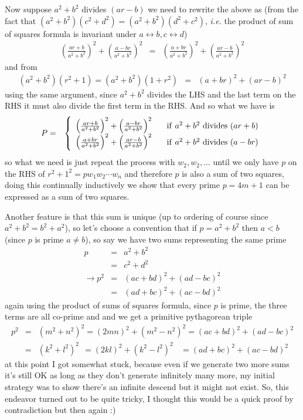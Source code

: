 \documentclass[aps,preprint,preprintnumbers,nofootinbib,showpacs,prd]{revtex4-1}
\newcommand{\ie}{{\it i.e.} }
\newcommand{\nbea}{\begin{eqnarray*}}
\newcommand{\neea}{\end{eqnarray*}}
\begin{document}
Now suppose $a^2 + b^2$ divides $(ar-b)$ we need to rewrite the above as (from the fact that $(a^2 + b^2)(c^2 + d^2) = (a^2 + b^2)(d^2 + c^2)$, \ie the product of sum of squares formula is invariant under $a\leftrightarrow b, c\leftrightarrow d$)
%
\nbea
\left(\frac{ar + b}{a^2 + b^2}\right)^2 + \left(\frac{a - br}{a^2 + b^2}\right)^2 & = & \left(\frac{a + br}{a^2 + b^2}\right)^2 + \left(\frac{ar - b}{a^2 + b^2}\right)^2
\neea
%
and from
%
\nbea
(a^2 + b^2)(r^2 + 1)  = (a^2 + b^2)(1 + r^2) & = & (a+br)^2 + (ar-b)^2
\neea
%
using the same argument, since $a^2 + b^2$ divides the LHS and the last term on the RHS it must also divide the first term in the RHS. And so what we have is
%
\nbea
P & = & \left \{
\begin{array}{l }
\left(\frac{ar + b}{a^2 + b^2}\right)^2 + \left(\frac{a - br}{a^2 + b^2}\right)^2 ~~~~~{\rm if~} a^2 + b^2 ~{\rm divides~} (ar+b) \\ 
\left(\frac{a + br}{a^2 + b^2}\right)^2 + \left(\frac{ar - b}{a^2 + b^2}\right)^2 ~~~~~{\rm if~} a^2 + b^2 ~{\rm divides~} (a-br)
\end{array} \right.
\neea
%
so what we need is just repeat the process with $w_2, w_2, \dots$ until we only have $p$ on the RHS of $r^2 + 1^2 = pw_1w_2\cdots w_n$ and therefore $p$ is also a sum of two squares, doing this continually inductively we show that every prime $p = 4m+1$ can be expressed as a sum of two squares.

Another feature is that this sum is unique (up to ordering of course since $a^2 + b^2 = b^2 + a^2$), so let's choose a convention that if $p = a^2 + b^2$ then $a<b$ (since $p$ is prime $a \neq b$), so say we have two sums representing the same prime
%
\nbea
p & = & a^2 + b^2 \\
& = & c^2 + d^2 \\
\to p^2 & = & (ac + bd)^2 + (ad-bc)^2 \\
& = & (ad + bc)^2 + (ac-bd)^2
\neea
%
again using the product of sums of squares formula, since $p$ is prime, the three terms are all co-prime and and we get a primitive pythagorean triple
%
\nbea
p^2 & = & (m^2 + n^2)^2 = (2mn)^2  + (m^2 - n^2)^2 = (ac + bd)^2 + (ad-bc)^2 \\
& = & (k^2 + l^2)^2 ~~= (2kl)^2  + (k^2 - l^2)^2 ~~~~= (ad + bc)^2 + (ac-bd)^2 
\neea
%
at this point I got somewhat stuck, because even if we generate two more sums it's still OK as long as they don't generate infinitely many more, my initial strategy was to show there's an infinite descend but it might not exist. So, this endeavor turned out to be quite tricky, I thought this would be a quick proof by contradiction but then again :)
\end{document}
